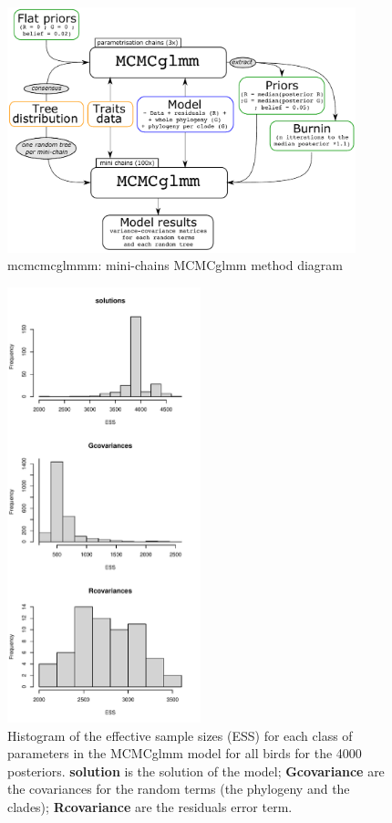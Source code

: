 \documentclass[sn-mathphys]{sn-jnl}%
\theoremstyle{thmstyleone}%
\theoremstyle{thmstyletwo}%
\theoremstyle{thmstylethree}%
\begin{document}
\begin{figure}[!htbp]
\centering
   \includegraphics[width=0.9\textwidth]{Figures/mini-chains_diagram.pdf}
\caption{mcmcmcglmmm: mini-chains MCMCglmm method diagram}
\label{Fig:fig_mcmcmcglmm}
\end{figure}


\begin{figure}[!htbp]
\centering
   \includegraphics[width=0.5\textwidth]{Figures/parameters_ESS_all_birds.pdf}
\caption{Histogram of the effective sample sizes (ESS) for each class of parameters in the MCMCglmm model for all birds for the 4000 posteriors. \textbf{solution} is the solution of the model; \textbf{Gcovariance} are the covariances for the random terms (the phylogeny and the clades); \textbf{Rcovariance} are the residuals error term.}
\label{Fig:model_ess_all_birds}
\end{figure}
\end{document}
